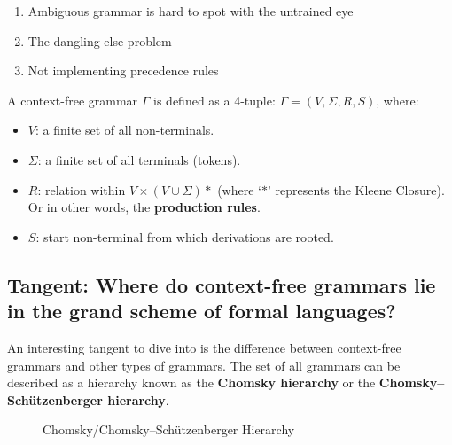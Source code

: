 \begin{enumerate}
    \item Ambiguous grammar is hard to spot with the untrained eye
    \item The dangling-else problem
    \item Not implementing precedence rules
\end{enumerate}

\begin{definition}
    A context-free grammar $\Gamma$ is defined as a 4-tuple: $\Gamma = (V, \Sigma, R, S)$, where:
    \begin{itemize}
        \item $V$: a finite set of all non-terminals.
        \item $\Sigma$: a finite set of all terminals (tokens).
        \item $R$: relation within $V \times (V \cup \Sigma)*$ (where `$*$' represents the Kleene Closure). Or in other words, the \textbf{production rules}.
        \item $S$: start non-terminal from which derivations are rooted.\textsuperscript{\cite{sipser_1997}}
    \end{itemize}
\end{definition}

\subsection{Tangent: Where do context-free grammars lie in the grand scheme of formal languages?}

An interesting tangent to dive into is the difference between context-free grammars and other types of grammars. The set of all grammars can be described as a hierarchy known as the \textbf{Chomsky hierarchy} or the \textbf{Chomsky–Schützenberger hierarchy}.\textsuperscript{\cite{chomsky_1956}}

\begin{figure}[h]
    \begin{center}
        \caption{\label{fig:3.2}Chomsky/Chomsky–Schützenberger Hierarchy}
    \end{center}
\end{figure}

